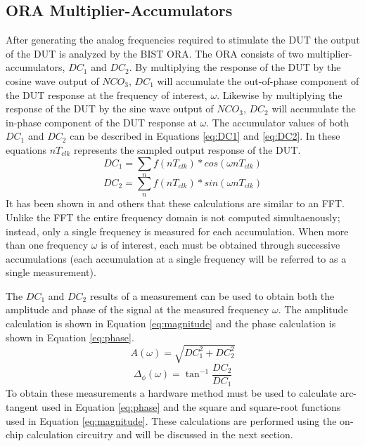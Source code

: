 \documentclass[12pt]{report}
\begin{document}
\subsection{ORA Multiplier-Accumulators}
\label{sct:bist-ora}
After generating the analog frequencies required to stimulate the DUT the output of the DUT is analyzed by the BIST ORA.  The ORA consists of two multiplier-accumulators, $DC_1$ and $DC_2$\cite{basessa}.  By multiplying the response of the DUT by the cosine wave output of $NCO_3$, $DC_1$ will accumulate the out-of-phase component of the DUT response at the frequency of interest, $\omega$.  Likewise by multiplying the response of the DUT by the sine wave output of $NCO_3$, $DC_2$ will accumulate the in-phase component of the DUT response at $\omega$.  The accumulator values of both $DC_1$ and $DC_2$ can be described in Equations \ref{eq:DC1} and \ref{eq:DC2}. In these equations $nT_{clk}$ represents the sampled output response of the DUT\cite{stroud-phase}.  
\begin{equation}
DC_1 = \sum_{n} f(nT_{clk})*cos(\omega nT_{clk})
\label{eq:DC1}
\end{equation}
\begin{equation}
DC_2 = \sum_{n} f(nT_{clk})*sin(\omega nT_{clk})
\label{eq:DC2}
\end{equation}
It has been shown in \cite{jie}\cite{stroud-phase} and others that these calculations are similar to an FFT.  Unlike the FFT the entire frequency domain is not computed simultaenously; instead,  only a single frequency is measured for each accumulation\cite{stroud-phase}.  When more than one frequency $\omega$ is of interest, each must be obtained through successive accumulations (each accumulation at a single frequency will be referred to as a single measurement).  

The $DC_1$ and $DC_2$ results of a measurement can be used to obtain both the amplitude and phase of the signal at the measured frequency $\omega$.  The amplitude calculation is shown in Equation \ref{eq:magnitude} and the phase calculation is shown in Equation \ref{eq:phase}\cite{jie}.
\begin{equation}
  A(\omega) = \sqrt{DC_1^2+DC_2^2}
  \label{eq:magnitude}
\end{equation}
\begin{equation}
  \Delta_\phi(\omega) = \tan^{-1}\frac{DC_2}{DC_1}
  \label{eq:phase}
\end{equation}
To obtain these measurements a hardware method must be used to calculate arc-tangent used in Equation \ref{eq:phase} and the square and square-root functions used in Equation \ref{eq:magnitude}.  These calculations are performed using the on-chip calculation circuitry and will be discussed in the next section.
\end{document}

